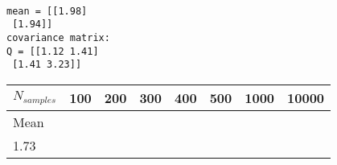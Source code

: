 \documentclass[11pt]{article}
\begin{document}
    \begin{center}
    \end{center}
    { \hspace*{\fill} \\}
    
    \begin{Verbatim}[commandchars=\\\{\}]
mean = [[1.98]
 [1.94]]
covariance matrix:
Q = [[1.12 1.41]
 [1.41 3.23]]

    \end{Verbatim}

    \begin{longtable}[]{@{}llllllll@{}}
\toprule
\begin{minipage}[b]{0.10\columnwidth}\raggedright
\(N_{samples}\)\strut
\end{minipage} & \begin{minipage}[b]{0.10\columnwidth}\raggedright
100\strut
\end{minipage} & \begin{minipage}[b]{0.10\columnwidth}\raggedright
200\strut
\end{minipage} & \begin{minipage}[b]{0.10\columnwidth}\raggedright
300\strut
\end{minipage} & \begin{minipage}[b]{0.10\columnwidth}\raggedright
400\strut
\end{minipage} & \begin{minipage}[b]{0.10\columnwidth}\raggedright
500\strut
\end{minipage} & \begin{minipage}[b]{0.10\columnwidth}\raggedright
1000\strut
\end{minipage} & \begin{minipage}[b]{0.10\columnwidth}\raggedright
10000\strut
\end{minipage}\tabularnewline
\midrule
\endhead
\begin{minipage}[t]{0.10\columnwidth}\raggedright
Mean\strut
\end{minipage} & \begin{minipage}[t]{0.10\columnwidth}\raggedright
\(\begin{array}{cc}1.93\\1.73\end{array}\)\strut
\end{minipage} & \begin{minipage}[t]{0.10\columnwidth}\raggedright

\end{minipage}
\end{longtable}
\end{document}

